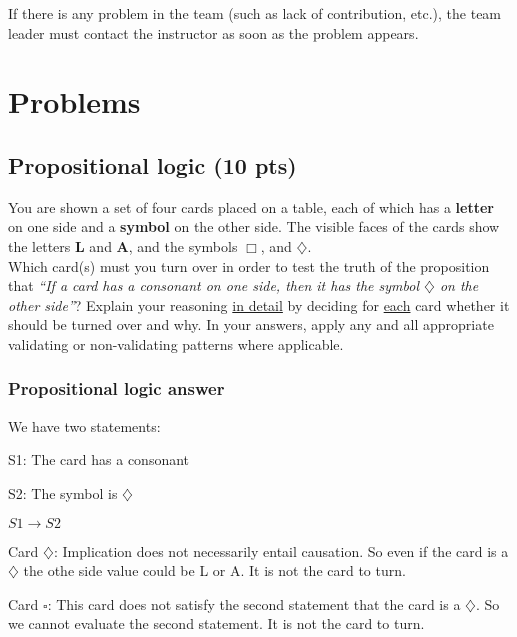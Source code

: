 \documentclass[12pt]{article}
\begin{document}
\noindent If there is any problem in the team (such as lack of contribution, etc.), the team leader must contact the instructor as soon as the problem appears.

\newpage

\section{Problems}

\subsection{Propositional logic (10 pts)}

\noindent You are shown a set of four cards placed on a table, each of which has a \textbf{letter} on one side and a \textbf{symbol} on the other side. The visible faces of the cards show the letters \textbf{L} and \textbf{A}, and the symbols \textbf{$\Box$}, and \textbf{$\diamondsuit$}.\\

\noindent Which card(s) must you turn over in order to test the truth of the proposition that \textit{``If a card has a consonant on one side, then it has the symbol $\diamondsuit$ on the other side''}? Explain your reasoning \underline{in detail} by deciding for \underline{each} card whether it should be turned over and why. In your answers, apply any and all appropriate validating or non-validating patterns where applicable.\\


\subsubsection{Propositional logic answer}

\noindent We have two statements:

\indent S1: The card has a consonant

\indent S2: The symbol is \textbf{$\diamondsuit$}

$ S1 \rightarrow S2$

\noindent Card \textbf{$\diamondsuit$}: Implication does not necessarily entail causation. So even if the card is a \textbf{$\diamondsuit$} the othe side value could be L or A. It is not the card to turn.

\noindent Card \textbf{$\square$}: This card does not satisfy the second statement that the card is a \textbf{$\diamondsuit$}. So we cannot evaluate the second statement. It is not the card to turn.
\end{document}
